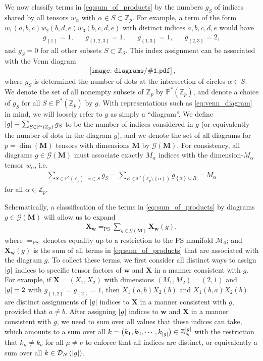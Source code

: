 \documentclass[nofootinbib,notitlepage,11pt]{revtex4-2}
\newcommand{\p}[1]{\left(#1\right)} %
\renewcommand{\set}[1]{\left\{#1\right\}} %
\newcommand{\m}{\bm} %
\newcommand{\1}{\mathds{1}}
\newcommand{\D}{\mathcal{D}}
\newcommand{\G}{\mathcal{G}}
\newcommand{\M}{\mathcal{M}}
\newcommand{\PP}{\mathbb{P}}
\newcommand{\ZZ}{\mathbb{Z}}
\newcommand{\EQPS}{=_{\text{PS}}}
\newcommand{\diagram}[1]
{\,\texttt{[image: diagrams/\#1.pdf]}\,}
\begin{document}
We now classify terms in \eqref{eq:sum_of_products} by the numbers
$g_S$ of indices shared by all tensors $w_\alpha$ with
$\alpha\in S\subset\ZZ_p$.  For example, a term of the form
$w_1\p{a,b,c} w_2\p{b,d,e} w_3\p{b,c,d,e}$ with distinct indices
$a,b,c,d,e$ would have
\begin{align}
  g_{\set{1}} = 1,
  &&
  g_{\set{1,2,3}} = 1,
  &&
  g_{\set{1,3}} = 1,
  &&
  g_{\set{2,3}} = 2,
\end{align}
and $g_S=0$ for all other subsets $S\subset\ZZ_3$.  This index
assignment can be associated with the Venn diagram
\begin{align}
  \diagram{example_123},
  \label{eq:venn_diagram}
\end{align}
where $g_S$ is determined the number of dots at the intersection of
circles $\alpha\in S$.  We denote the set of all nonempty subsets of
$\ZZ_p$ by $\PP^*\p{\ZZ_p}$, and denote a choice of $g_S$ for all
$S\in\PP^*\p{\ZZ_p}$ by $g$.  With representations such as
\eqref{eq:venn_diagram} in mind, we will loosely refer to $g$ as
simply a ``diagram''.  We define
$\abs{g}\equiv\sum_{S\in\PP^*\p{\ZZ_p}}g_S$ to be the number of
indices considered in $g$ (or equivalently the number of dots in the
diagram $g$), and we denote the set of all diagrams for
$p=\dim\p{\m M}$ tensors with dimensions $\m M$ by $\G\p{\m M}$.  For
consistency, all diagrams $g\in\G\p{\m M}$ must associate exactly
$M_\alpha$ indices with the dimension-$M_\alpha$ tensor $w_\alpha$,
i.e.
\begin{align}
  \sum_{S\in\PP^*\p{\ZZ_p}\,:\,\alpha\in S} g_S
  = \sum_{R\in\PP^*\p{\ZZ_p\setminus\set{\alpha}}} g_{\set{\alpha}\cup R}
  = M_\alpha
\end{align}
for all $\alpha\in\ZZ_p$.

Schematically, a classification of the terms in
\eqref{eq:sum_of_products} by diagrams $g\in\G\p{\m M}$ will allow us
to expand
\begin{align}
  \m X_{\m w} \EQPS \sum_{g\in\G\p{\m M}} \m X_{\m w}\p{g},
  \label{eq:sym_prod_diagrams}
\end{align}
where $\EQPS$ denotes equality up to a restriction to the PS manifold
$\M_0$; and $\m X_{\m w}\p{g}$ is the sum of all terms in
\eqref{eq:sum_of_products} that are associated with the diagram $g$.
To collect these terms, we first consider all distinct ways to assign
$\abs{g}$ indices to specific tensor factors of $\m w$ and $\m X$ in a
manner consistent with $g$.  For example, if $\m X=\p{X_1,X_2}$ with
dimensions $\p{M_1,M_2}=\p{2,1}$ and $\abs{g}=2$ with
$g_{\set{1,2}}=g_{\set{2}}=1$, then $X_1\p{a,b} X_2\p{b}$ and
$X_1\p{b,a} X_2\p{b}$ are distinct assignments of $\abs{g}$ indices to
$\m X$ in a manner consistent with $g$, provided that $a\ne b$.  After
assigning $\abs{g}$ indices to $\m w$ and $\m X$ in a manner
consistent with $g$, we need to sum over all values that these indices
can take, which amounts to a sum over all
$k=\p{k_1,k_2,\cdots,k_{\abs{g}}}\in\ZZ_N^{\abs{g}}$ with the
restriction that $k_\mu\ne k_\nu$ for all $\mu\ne\nu$ to enforce that
all indices are distinct, or equivalently a sum over all
$k\in\D_N\p{\abs{g}}$.
\end{document}
